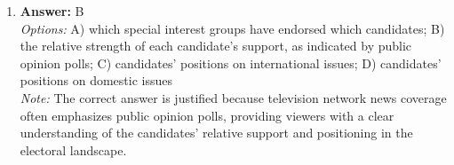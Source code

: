 \documentclass[12pt]{article}
\begin{document}
\begin{enumerate}[label=\arabic*.]
\\ \textit{Note:} The creation of the National Intelligence Director was proposed by the 9/11 Commission to enhance coordination and oversight within the U.S. intelligence community, addressing the fragmented structure that contributed to the failures in intelligence leading up to the September 11 attacks.
\item \textbf{Answer:} B
\\ \textit{Options:} A) which special interest groups have endorsed which candidates; B) the relative strength of each candidate's support, as indicated by public opinion polls; C) candidates' positions on international issues; D) candidates' positions on domestic issues
\\ \textit{Note:} The correct answer is justified because television network news coverage often emphasizes public opinion polls, providing viewers with a clear understanding of the candidates' relative support and positioning in the electoral landscape.
\end{enumerate}
\end{document}
